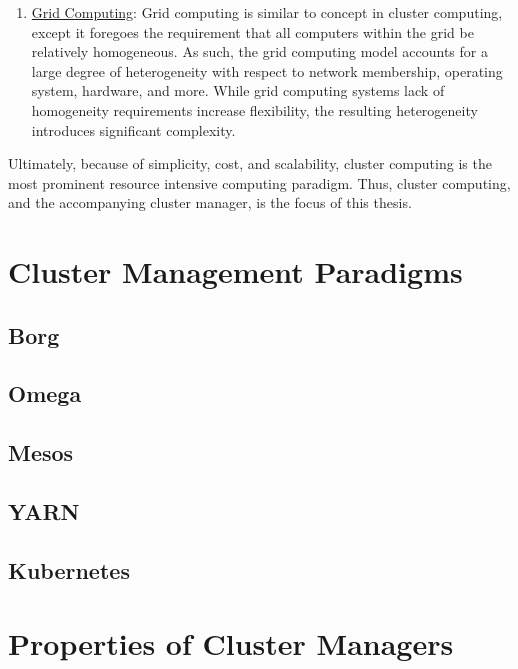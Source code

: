 \documentclass[twoside]{report}
\begin{document}
\begin{enumerate}
  \item \underline{Grid Computing}: Grid computing is similar to concept in
    cluster computing, except it foregoes the requirement that all computers
    within the grid be relatively homogeneous. As such, the grid computing model accounts
    for a large degree of heterogeneity with respect to network membership,
    operating system, hardware, and more.\cite[pg.
    18]{distributed-systems-principles-and-paradigms} While grid computing
    systems lack of homogeneity requirements increase flexibility,
    the resulting heterogeneity introduces significant complexity.

\end{enumerate}

Ultimately, because of simplicity, cost, and scalability, cluster computing is
the most prominent resource intensive computing paradigm. Thus, cluster
computing, and the accompanying cluster manager, is the focus of this
thesis.

\section{Cluster Management Paradigms}

\subsection{Borg}

\subsection{Omega}

\subsection{Mesos}

\subsection{YARN}

\subsection{Kubernetes}

\section{Properties of Cluster Managers}
\end{document}
